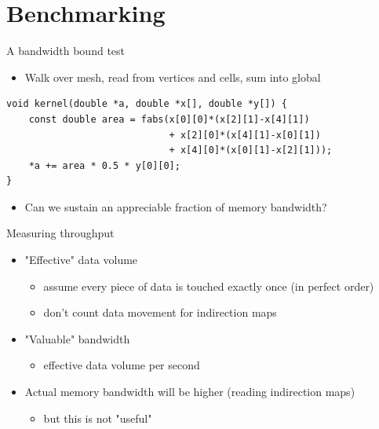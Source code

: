 \documentclass[bigger]{beamer}
\begin{document}
\section{Benchmarking}
\label{sec:orgheadline23}
\begin{frame}[fragile,label={sec:orgheadline15}]{A bandwidth bound test}
 \begin{itemize}
\item Walk over mesh, read from vertices and cells, sum into global
\end{itemize}
\begin{verbatim}
void kernel(double *a, double *x[], double *y[]) {
    const double area = fabs(x[0][0]*(x[2][1]-x[4][1])
                             + x[2][0]*(x[4][1]-x[0][1])
                             + x[4][0]*(x[0][1]-x[2][1]));
    *a += area * 0.5 * y[0][0];
}
\end{verbatim}
\begin{itemize}
\item Can we sustain an appreciable fraction of memory bandwidth?
\end{itemize}
\end{frame}

\begin{frame}[label={sec:orgheadline16}]{Measuring throughput}
\begin{itemize}
\item "Effective" data volume
\begin{itemize}
\item assume every piece of data is touched exactly once (in perfect
order)
\item don't count data movement for indirection maps
\end{itemize}
\item "Valuable" bandwidth
\begin{itemize}
\item effective data volume per second
\end{itemize}
\item Actual memory bandwidth will be higher (reading indirection maps)
\begin{itemize}
\item but this is not "useful"
\end{itemize}
\end{itemize}
\end{frame}
\end{document}
